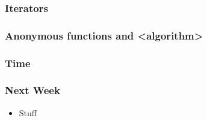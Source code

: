 \documentclass[glossy]{beamer}
\begin{document}
\begin{frame}[fragile=singleslide]
  \frametitle{Iterators}
  \begin{cppcode}
  \end{cppcode}
\end{frame}

\begin{frame}[fragile=singleslide]
  \frametitle{Anonymous functions and <algorithm>}
  \begin{cppcode}
  \end{cppcode}
\end{frame}

\begin{frame}[fragile=singleslide]
  \frametitle{Time}
  \begin{cppcode}
  \end{cppcode}
\end{frame}

\begin{frame}[fragile=singleslide]
  \frametitle{Next Week}
  \begin{itemize}
    \item Stuff
  \end{itemize}
\end{frame}
\end{document}
